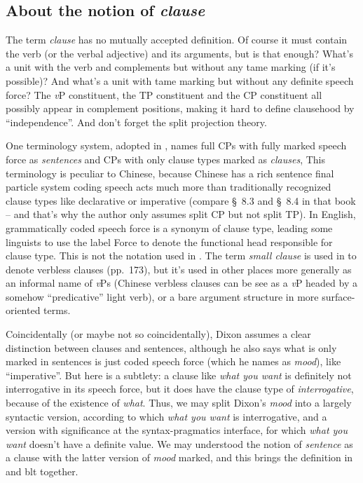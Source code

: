 \documentclass[UTF8, a4paper, oneside, scheme=plain]{ctexart}
\newcommand*{\citesec}[1]{\S~{#1}}
\newcommand*{\citepage}[1]{pp.~{#1}}
\newcommand*{\term}[1]{\emph{#1}}
\newcommand*{\corpus}[1]{\emph{#1}}
\newcommand*{\vP}{\textit{v}P}
\begin{document}
\subsection{About the notion of \term{clause}}

The term \term{clause} has no mutually accepted definition.
Of course it must contain the verb (or the verbal adjective)
and its arguments,
but is that enough?
What's a unit with the verb and complements but without any \ac{tame} marking
(if it's possible)?
And what's a unit with \ac{tame} marking but without any definite speech force? %
The \vP{} constituent, the TP constituent and the CP constituent 
all possibly appear in complement positions,
making it hard to define clausehood by ``independence''.
And don't forget the split projection theory.

One terminology system, 
adopted in \citep[\citepage{140}]{deng2010formal},
names full CPs with fully marked speech force as \term{sentences} 
and CPs with only clause types marked as \term{clauses},
This terminology is peculiar to Chinese,
because Chinese has a rich sentence final particle system 
coding speech acts much more than traditionally recognized clause types like declarative or imperative
(compare \citesec{8.3} and \citesec{8.4} in that book 
-- and that's why the author only assumes split CP but not split TP).
In English, grammatically coded speech force is a synonym of clause type,
leading some linguists to use the label Force to denote the functional head responsible for clause type.
This is not the notation used in \citet[\citepage{142}]{deng2010formal}.
The term \term{small clause} is used in \citet{deng2010formal} 
to denote verbless clauses (\citepage{173}),
but it's used in other places more generally as an informal name of \vP s
(Chinese verbless clauses can be see as a \vP{} headed by a somehow ``predicative'' light verb),
or a bare argument structure in more surface-oriented terms.

Coincidentally (or maybe not so coincidentally),
Dixon assumes a clear distinction between clauses and sentences,
although he also says what is only marked in sentences 
is just coded speech force (which he names as \term{mood}),
like ``imperative''.
But here is a subtlety:
a clause like \corpus{what you want} is definitely not interrogative in its speech force,
but it does have the clause type of \term{interrogative},
because of the existence of \corpus{what}.
Thus, we may split Dixon's \term{mood} into a largely syntactic version,
according to which \corpus{what you want} is interrogative,
and a version with significance at the syntax-pragmatics interface,
for which \corpus{what you want} doesn't have a definite value.
We may understood the notion of \term{sentence} as a clause 
with the latter version of \term{mood} marked,
and this brings the definition in \citet{deng2010formal} and \ac{blt} together.
\end{document}
